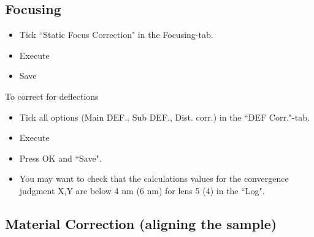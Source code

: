 \subsection{Focusing}
\label{sec:focusing}

\begin{itemize}
\item Tick ``Static Focus Correction" in the Focusing-tab.
\item Execute
\item Save
\end{itemize}

To correct for deflections

\begin{itemize}
\item Tick  all options (Main DEF.,  Sub DEF., Dist.  corr.)   in the
  ``DEF Corr."-tab.
\item Execute
\item Press OK and ``Save".
\item You  may want  to check  that the  calculations values  for the
  convergence judgment X,Y  are below 4 nm  (6 nm) for lens  5 (4) in
  the ``Log".
\end{itemize}

\subsection{Material Correction (aligning the sample)}
\label{sec:material-correction}

